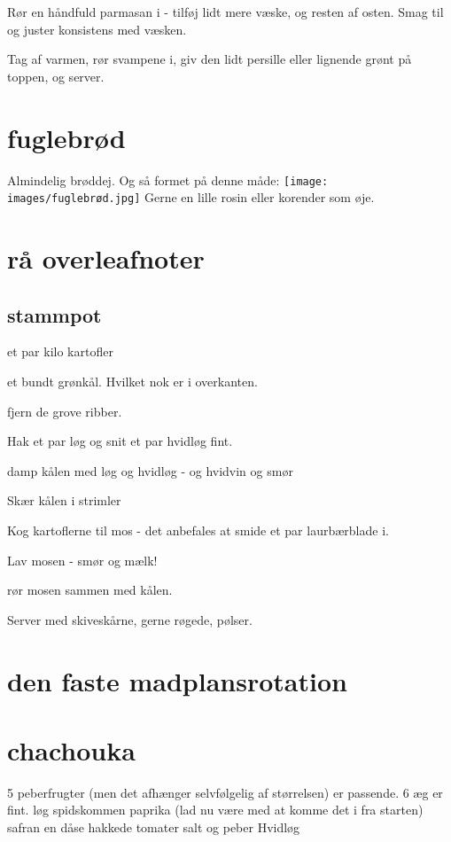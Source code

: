 \documentclass[
]{book}
\begin{document}
Rør en håndfuld parmasan i - tilføj lidt mere væske, og
resten af osten. Smag til og juster konsistens med væsken.

Tag af varmen, rør svampene i, giv den lidt persille eller lignende
grønt på toppen, og server.

\section{fuglebrød}\label{fuglebruxf8d}

Almindelig brøddej. Og så formet på denne måde:
\texttt{[image: images/fuglebrød.jpg]}
Gerne en lille rosin eller korender som øje.

\section{rå overleafnoter}\label{ruxe5-overleafnoter}

\subsection{stammpot}\label{stammpot}

et par kilo kartofler

et bundt grønkål. Hvilket nok er i overkanten.

fjern de grove ribber.

Hak et par løg og snit et par hvidløg fint.

damp kålen med løg og hvidløg - og hvidvin og smør

Skær kålen i strimler

Kog kartoflerne til mos - det anbefales at smide et par laurbærblade i.

Lav mosen - smør og mælk!

rør mosen sammen med kålen.

Server med skiveskårne, gerne røgede, pølser.

\section{den faste madplansrotation}\label{den-faste-madplansrotation}

\section{chachouka}\label{chachouka}

5 peberfrugter (men det afhænger selvfølgelig af størrelsen) er passende.
6 æg er fint.
løg
spidskommen
paprika (lad nu være med at komme det i fra starten)
safran
en dåse hakkede tomater
salt og peber
Hvidløg
\end{document}
